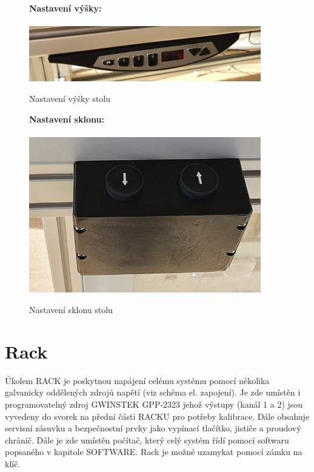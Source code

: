 	\begin{figure}[ht!]
		\begin{minipage}{0.49\textwidth}
			\vspace{-3.3cm}
			\textbf{Nastavení výšky:}\\\\
			\includegraphics[width = 0.9\textwidth]{obrazky/vyska.png}
            \caption{Nastavení výšky stolu}
			
		\end{minipage}
		\begin{minipage}{0.49\textwidth}
			\textbf{Nastavení sklonu:}\\\\
			\includegraphics[width = 0.9\textwidth]{obrazky/sklon.png}
            \caption{Nastavení sklonu stolu}
			
		\end{minipage}
	\end{figure}

	\section{Rack}
	Úkolem RACK je poskytnou napájení celému systému pomocí několika galvanicky oddělených zdrojů napětí (viz schéma el. zapojení).
	Je zde umístěn i programovatelný zdroj GWINSTEK GPP-2323 jehož výstupy (kanál 1 a 2)
	jsou vyvedeny do svorek na přední části RACKU pro potřeby kalibrace.
	Dále obsahuje servisní zásuvku a bezpečnostní prvky jako vypínací tlačítko, jističe a proudový chránič.
	Dále je zde umístěn počítač, který celý systém řídí pomocí softwaru popsaného v kapitole SOFTWARE.
    Rack je možné uzamykat pomocí zámku na klíč.

